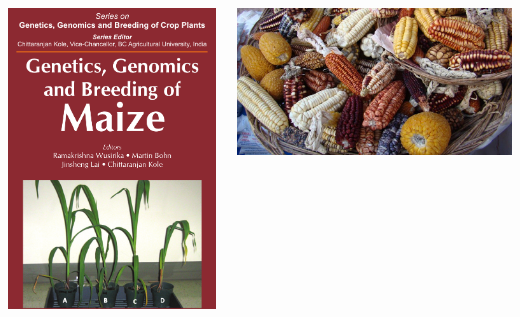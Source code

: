 \documentclass[
  ignorenonframetext,
  aspectratio=169]{beamer}
\newcommand{\bcolumns}{\begin{columns}[T, onlytextwidth]}
\newcommand{\ecolumns}{\end{columns}}
\begin{document}
\begin{frame}{}
\protect\hypertarget{section-10}{}
\bcolumns
{}

\begin{center}\includegraphics[width=0.75\linewidth]{../images/maize_synthesis_book} \end{center}


\begin{center}\includegraphics[width=0.99\linewidth]{../images/maize_diversity} \end{center}

\ecolumns
\end{frame}
\end{document}

